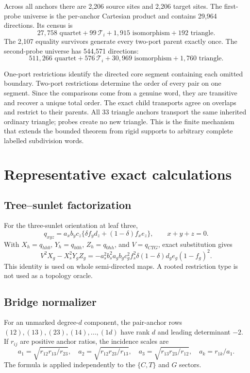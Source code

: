 \documentclass[11pt]{article}
\theoremstyle{remark}
\newcommand{\Ti}{\mathcal T_i}
\begin{document}
Across all anchors there are 2,206 source sites and 2,206 target sites.  The
first-probe universe is the per-anchor Cartesian product and contains 29,964
directions.  Its census is
\[
27,758\text{ quartet}+99\ \Ti+1,915\text{ isomorphism}
+192\text{ triangle}.
\]
The 2,107 equality survivors generate every two-port parent exactly once.
The second-probe universe has 544,571 directions:
\[
511,266\text{ quartet}+576\ \Ti+30,969\text{ isomorphism}
+1,760\text{ triangle}.
\]

One-port restrictions identify the directed core segment containing each
omitted boundary.  Two-port restrictions determine the order of every pair on
one segment.  Since the comparisons come from a genuine word, they are
transitive and recover a unique total order.  The exact child transports
agree on overlaps and restrict to their parents.  All 33 triangle anchors
transport the same inherited ordinary triangle; probes create no new
triangle.  This is the finite mechanism that extends the bounded theorem from
rigid supports to arbitrary complete labelled subdivision words.

\section{Representative exact calculations}\label{sec:calculations}

\subsection{Tree--sunlet factorization}

For the three-sunlet orientation at leaf three,
\[
q_{xyz}=a_xb_yc_z\{\delta f_yd_z+(1-\delta)f_xe_z\},\qquad x+y+z=0.
\]
With \(X_h=q_{hh0}\), \(Y_h=q_{h0h}\), \(Z_h=q_{0hh}\), and
\(V=q_{CTG}\), exact substitution gives
\[
V^2X_g-X_s^2Y_gZ_g=
-a_s^2b_s^2a_gb_gc_g^2f_s^2\delta(1-\delta)d_ge_g(1-f_g)^2.
\]
This identity is used on whole semi-directed maps.  A rooted restriction type
is not used as a topology oracle.

\subsection{Bridge normalizer}

For an unmarked degree-\(d\) component, the pair-anchor rows
\((12),(13),(23),(14),\ldots,(1d)\) have rank \(d\) and leading determinant
\(-2\).  If \(r_{ij}\) are positive anchor ratios, the incidence scales are
\[
a_1=\sqrt{r_{12}r_{13}/r_{23}},\quad
a_2=\sqrt{r_{12}r_{23}/r_{13}},\quad
a_3=\sqrt{r_{13}r_{23}/r_{12}},\quad
a_k=r_{1k}/a_1.
\]
The formula is applied independently to the \(\{C,T\}\) and \(G\) sectors.
\end{document}

